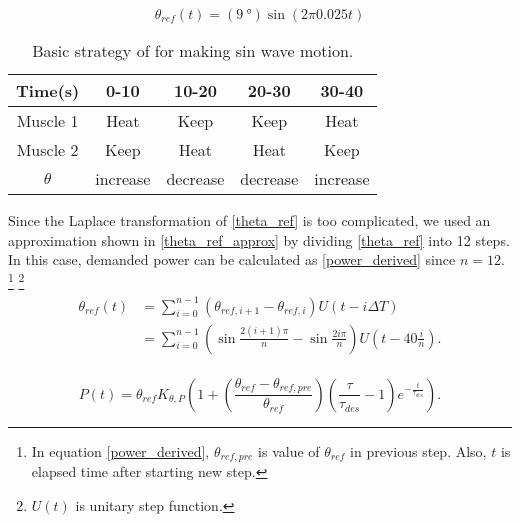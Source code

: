 


\begin{equation}\label{theta_ref}
\theta_{ref}(t)=(\SI{9}{\degree})\sin(2\pi 0.025t)
\end{equation}

\begin{table}[b]
	\caption{Basic strategy of \apc for making sin wave motion.}
	\label{table_apc_basic}
	\begin{center}
		\begin{tabular}{c||c|c|c|c}
			\hline
			Time(s) & 0-10 & 10-20 & 20-30 & 30-40 \\
			\hline
			Muscle 1 & Heat & Keep & Keep & Heat \\
			Muscle 2 & Keep & Heat & Heat & Keep \\
			\hline
			$\theta$ & increase & decrease & decrease & increase \\
			\hline
		\end{tabular}
	\end{center}
\end{table}

Since the Laplace transformation of \eqref{theta_ref} is too complicated, we used an approximation shown in \eqref{theta_ref_approx} by dividing \eqref{theta_ref} into 12 steps. In this case, demanded power can be calculated as \eqref{power_derived} since $n=12$.
\footnote{In equation \eqref{power_derived}, $\theta_{ref,pre}$ is value of $\theta_{ref}$ in previous step. Also, $t$ is elapsed time after starting new step.}
\footnote{$U(t)$ is unitary step function.}
\begin{equation} \label{theta_ref_approx}
\begin{aligned} 
\theta_{ref}(t) & = \sum_{i=0}^{n-1}{(\theta_{ref,i+1}-\theta_{ref,i})U(t-i\Delta T)} \\
& = \sum_{i=0}^{n-1}{\left(\sin{\frac{2(i+1)\pi}{n}}-\sin{\frac{2i\pi}{n}}\right)U\left(t-40\frac{i}{n}\right)}. \\
\end{aligned}
\end{equation}

\begin{equation} \label{power_derived}
P(t)=\theta_{ref}K_{\theta,P}\left(1+\left(\frac{\theta_{ref}-\theta_{ref,pre}}{\theta_{ref}}\right)\left(\frac{\tau}{\tau_{des}}-1\right)e^{-\frac{t}{\tau_{des}}}\right).
\end{equation}

